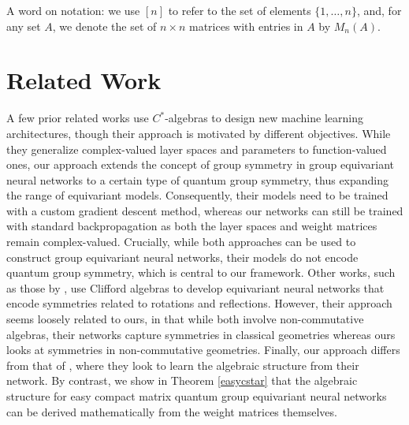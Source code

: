 \documentclass{article}
\theoremstyle{plain}
\theoremstyle{definition}
\theoremstyle{remark}
\begin{document}


A word on notation: we use $[n]$ to refer to the set of elements $\{1, \ldots, n\}$, and, for any set $A$, we denote the set of $n \times n$ matrices with entries in $A$ by $M_n(A)$.



\section{Related Work}

A few prior related works \citep{hashimoto22, hataya2023, hashimoto24a}
use $C^*$-algebras to design new machine learning architectures, though their approach
is motivated by different objectives.
While they generalize complex-valued layer spaces and parameters to function-valued ones,
our approach extends the concept of group symmetry in group equivariant neural networks to a certain type of quantum group symmetry, thus expanding the range of equivariant models. 
Consequently, their models need to be trained with a custom gradient descent method, 
whereas 
our networks can still be trained 
with standard backpropagation as both the layer spaces and weight matrices remain
complex-valued.
Crucially, while both approaches can be used to construct 
group equivariant neural networks, their models do not encode quantum group symmetry, 
which is central to our framework.
Other works, such as those by \citet{ruhe23b, ruhe23a},
use Clifford algebras to develop equivariant
neural networks that encode symmetries related to rotations and reflections. 
However, their approach seems loosely related to ours, in that while both involve
non-commutative algebras, their networks capture symmetries in classical geometries 
whereas ours looks at symmetries in non-commutative geometries.
Finally, our approach differs from that of \citet{hoffmann2020}, where
they look to learn the algebraic structure from their network. 
By contrast, we show in Theorem \ref{easycstar} that
the algebraic structure for easy compact matrix quantum group equivariant neural networks
can be derived mathematically from the weight matrices themselves.



\end{document}
